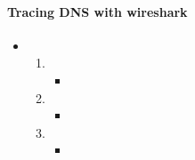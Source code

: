 \documentclass{article}
\begin{document}
  \paragraph{Tracing DNS with wireshark}
  \begin{itemize}
    \item\begin{enumerate}
      \item 
        \begin{itemize}
          \item 
          
        \end{itemize}
      \item 
          \begin{itemize}
            \item 
          \end{itemize}

      \item 
          \begin{itemize}
            \item 
          \end{itemize}
    \end{enumerate}
  \end{itemize}
\end{document}
